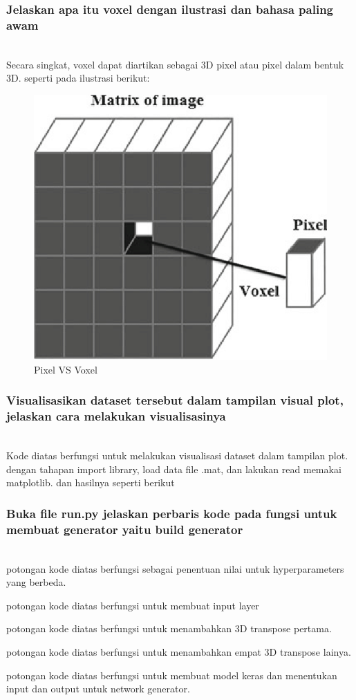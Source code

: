 \subsubsection{Jelaskan apa itu voxel dengan ilustrasi dan bahasa paling awam}
\hfill\\
Secara singkat, voxel dapat diartikan sebagai 3D pixel atau pixel dalam bentuk 3D. seperti pada ilustrasi berikut:
\begin{figure}[H]
	\centering
	\includegraphics[width=12cm]{figures/1174070/8/voxel.png}
	\caption{Pixel VS Voxel}
\end{figure}


\subsubsection{Visualisasikan dataset tersebut dalam tampilan visual plot, jelaskan cara melakukan visualisasinya}
\hfill\\

Kode diatas berfungsi untuk melakukan visualisasi dataset dalam tampilan plot. dengan tahapan import library, load data file .mat, dan lakukan read memakai matplotlib. dan hasilnya seperti berikut


\subsubsection{Buka file run.py jelaskan perbaris kode pada fungsi untuk membuat generator yaitu build generator}
\hfill\\

potongan kode diatas berfungsi sebagai penentuan nilai untuk hyperparameters yang berbeda.

potongan kode diatas berfungsi untuk membuat input layer

potongan kode diatas berfungsi untuk menambahkan 3D transpose pertama.

potongan kode diatas berfungsi untuk menambahkan empat 3D transpose lainya.

potongan kode diatas berfungsi untuk membuat model keras dan menentukan input dan output untuk network generator.

